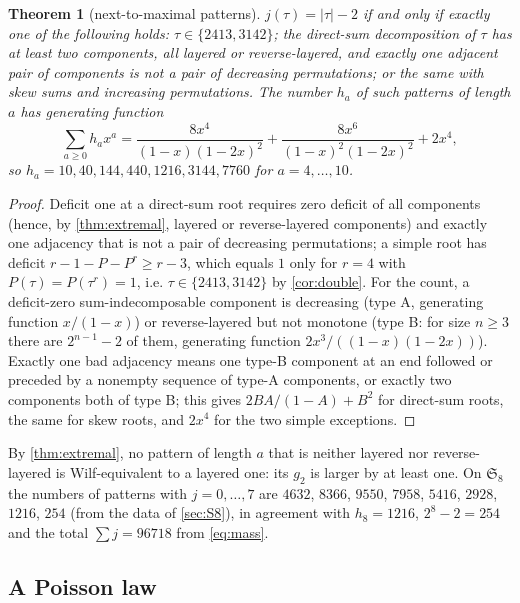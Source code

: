 \documentclass[11pt,reqno]{amsart}
\theoremstyle{plain}
\newtheorem{theorem}{Theorem}[section]
\theoremstyle{definition}
\theoremstyle{remark}
\newcommand{\Sym}{\mathfrak{S}}
\begin{document}
\begin{theorem}[next-to-maximal patterns]\label{thm:nextmax}
$j(\tau)=|\tau|-2$ if and only if exactly one of the following holds: $\tau\in\{2413,3142\}$; the direct-sum decomposition of $\tau$ has at least two components, all layered or reverse-layered, and exactly one adjacent pair of components is not a pair of decreasing permutations; or the same with skew sums and increasing permutations. The number $h_a$ of such patterns of length $a$ has generating function
\begin{equation}\label{eq:H}
\sum_{a\ge0}h_ax^a=\frac{8x^4}{(1-x)(1-2x)^2}+\frac{8x^6}{(1-x)^2(1-2x)^2}+2x^4,
\end{equation}
so $h_a=10,40,144,440,1216,3144,7760$ for $a=4,\dots,10$.
\end{theorem}

\begin{proof}
Deficit one at a direct-sum root requires zero deficit of all components (hence, by \cref{thm:extremal}, layered or reverse-layered components) and exactly one adjacency that is not a pair of decreasing permutations; a simple root has deficit $r-1-P-P^r\ge r-3$, which equals $1$ only for $r=4$ with $P(\tau)=P(\tau^r)=1$, i.e. $\tau\in\{2413,3142\}$ by \cref{cor:double}. For the count, a deficit-zero sum-indecomposable component is decreasing (type A, generating function $x/(1-x)$) or reverse-layered but not monotone (type B: for size $n\ge3$ there are $2^{n-1}-2$ of them, generating function $2x^3/((1-x)(1-2x))$). Exactly one bad adjacency means one type-B component at an end followed or preceded by a nonempty sequence of type-A components, or exactly two components both of type B; this gives $2BA/(1-A)+B^2$ for direct-sum roots, the same for skew roots, and $2x^4$ for the two simple exceptions.
\end{proof}

By \cref{thm:extremal}, no pattern of length $a$ that is neither layered nor reverse-layered is Wilf-equivalent to a layered one: its $g_2$ is larger by at least one. On $\Sym_8$ the numbers of patterns with $j=0,\dots,7$ are $4632$, $8366$, $9550$, $7958$, $5416$, $2928$, $1216$, $254$ (from the data of \cref{sec:S8}), in agreement with $h_8=1216$, $2^8-2=254$ and the total $\sum j=96718$ from \eqref{eq:mass}.

\subsection{A Poisson law}\label{sec:poisson}
\end{document}
